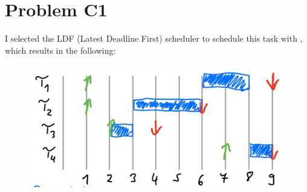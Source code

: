 \documentclass[12pt]{article}
\begin{document}
\lstset{language=C++}

\section*{Problem C1}
I selected the LDF (Latest Deadline First) scheduler to schedule this task with , which results in the following:
\begin{figure}[h]
	\centering
	\includegraphics[scale = 0.25]{figures/c1}\\
\end{figure}

\newpage
\end{document}
